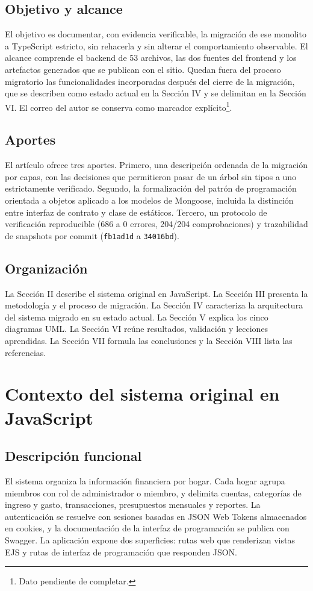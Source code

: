 \documentclass[conference]{IEEEtran}
\begin{document}
\subsection{Objetivo y alcance}
El objetivo es documentar, con evidencia verificable, la migración de ese
monolito a TypeScript estricto, sin rehacerla y sin alterar el comportamiento
observable. El alcance comprende el backend de 53 archivos, las dos fuentes
del frontend y los artefactos generados que se publican con el sitio. Quedan
fuera del proceso migratorio las funcionalidades incorporadas después del
cierre de la migración, que se describen como estado actual en la Sección IV y
se delimitan en la Sección VI. El correo del autor se conserva como marcador
explícito\footnote{Dato pendiente de completar.}.

\subsection{Aportes}
El artículo ofrece tres aportes. Primero, una descripción ordenada de la
migración por capas, con las decisiones que permitieron pasar de un árbol sin
tipos a uno estrictamente verificado. Segundo, la formalización del patrón de
programación orientada a objetos aplicado a los modelos de Mongoose, incluida
la distinción entre interfaz de contrato y clase de estáticos. Tercero, un
protocolo de verificación reproducible (686 a 0 errores, 204/204
comprobaciones) y trazabilidad de snapshots por commit
(\texttt{fb1ad1d} a \texttt{34016bd}).

\subsection{Organización}
La Sección II describe el sistema original en JavaScript. La Sección III
presenta la metodología y el proceso de migración. La Sección IV caracteriza
la arquitectura del sistema migrado en su estado actual. La Sección V explica
los cinco diagramas UML. La Sección VI reúne resultados, validación y lecciones
aprendidas. La Sección VII formula las conclusiones y la Sección VIII lista las
referencias.

\section{Contexto del sistema original en JavaScript}

\subsection{Descripción funcional}
El sistema organiza la información financiera por hogar. Cada hogar agrupa
miembros con rol de administrador o miembro, y delimita cuentas, categorías de
ingreso y gasto, transacciones, presupuestos mensuales y reportes. La
autenticación se resuelve con sesiones basadas en JSON Web Tokens almacenados
en cookies, y la documentación de la interfaz de programación se publica con
Swagger. La aplicación expone dos superficies: rutas web que renderizan vistas
EJS y rutas de interfaz de programación que responden JSON.
\end{document}
